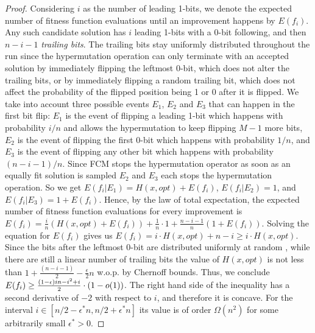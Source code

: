 \documentclass[lettersize,journal]{IEEEtran}
\begin{document}
\begin{proof}
Considering $i$ as the number of leading 1-bits, we denote the expected number of fitness function evaluations until an improvement happens by $E(f_i)$. Any such candidate solution has $i$ leading 1-bits with a 0-bit following, and then $n-i-1$ \emph{trailing bits}. The trailing bits stay uniformly distributed throughout the run since the hypermutation operation can only terminate with an accepted solution by immediately flipping the leftmost $0$-bit, which does not alter the trailing bits, or by immediately flipping a random trailing bit, which does not affect the probability of the flipped position being 1 or 0 after it is flipped\cite{DrosteJansenWegener2002}.   We take into account three possible events $E_1$, $E_2$ and $E_3$ that can happen in the first bit flip: $E_1$ is the event of flipping a leading 1-bit which happens with probability $i/n$ {\color{black} and allows the hypermutation to keep flipping $M-1$ more bits}, $E_2$ is the event of flipping the first 0-bit which happens with probability $1/n$, and $E_3$ is the event of flipping any other bit which happens with probability $(n-i-1)/n$. {\color{black}Since FCM stops the hypermutation operator as soon as an equally fit solution is sampled $E_2$ and $E_3$ each stops the hypermutation operation.} So we get $E(f_i|E_1)=H(x,opt)+ E(f_i)$, $E(f_i|E_2)=1$, and $E(f_i|E_3)=1+ E(f_i)$. Hence, by the law of total expectation, the expected number of fitness function evaluations for every improvement is $ E(f_i) = \frac{i}{n} \left( H(x,opt)+ E(f_i)\right) + \frac{1}{n} \cdot 1 +\frac{n-i-1}{n} \left( 1+ E(f_i)\right)$. Solving the equation for $E(f_i)$ gives us $E(f_i)=
i\cdot H(x,opt)+n-i\geq i\cdot H(x,opt) $. Since the bits after the leftmost 0-bit are distributed uniformly at random \cite{DrosteJansenWegener2002}, {\color{black} while there are still a linear number of trailing bits} the value of $H(x,opt)$ is not less than $1+ \frac{(n-i-1)}{2}- \frac{\epsilon }{2}n$ w.o.p. by Chernoff bounds. Thus, we conclude $E(f_i) \geq \frac{(1-\epsilon)in-i^2+i}{2}\cdot {\color{black}(1-o(1))}$. The right hand side of the inequality has a second derivative of $-2$ with respect to $i$, and therefore it is concave. For the interval $i\in [n/2-\epsilon^*n, n/2+\epsilon^*n]$ its value is of order $\Omega(n^2)$ for some   arbitrarily small $\epsilon^*>0$.



\end{proof}
\end{document}
